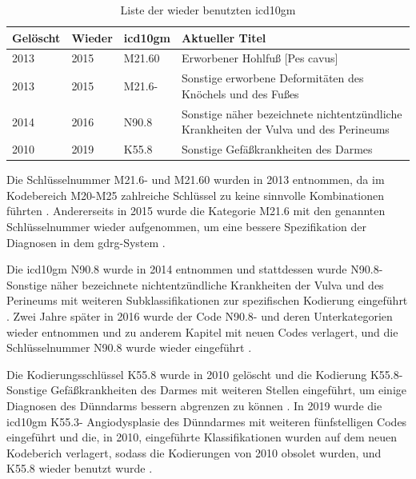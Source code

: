 \begin{table}[ht]
	\centering
	\small
	\caption[Wieder benutzte \acs{icd10gm}]{Liste der wieder benutzten \ac{icd10gm}}
	\label{tab:wieder}
	\begin{tabular}{|l|l|l|p{6cm}|}
		\hline
		\rowcolor{lightgray} Gelöscht & Wieder & \ac{icd10gm} & Aktueller Titel \\ \hline
		2013 & 2015 & M21.60 & Erworbener Hohlfuß [Pes cavus] \\ \hline
		2013 & 2015 & M21.6- & Sonstige erworbene Deformitäten des Knöchels und des Fußes \\ \hline
		2014 & 2016 & N90.8 & Sonstige näher bezeichnete nichtentzündliche Krankheiten der Vulva und des Perineums \\ \hline
		2010 & 2019 & K55.8 & Sonstige Gefäßkrankheiten des Darmes \\ \hline

\end{tabular}
\end{table}

Die Schlüsselnummer \textsf{M21.6-} und \textsf{M21.60} wurden in 2013 entnommen, da im Kodebereich \textsf{M20-M25} zahlreiche Schlüssel zu keine sinnvolle Kombinationen führten \cite{dele13}. Andererseits in 2015 wurde die Kategorie \textsf{M21.6} mit den genannten Schlüsselnummer wieder aufgenommen, um eine bessere Spezifikation der Diagnosen in dem \ac{gdrg}-System \cite{komm15}. 

Die \ac{icd10gm} \textsf{N90.8} wurde in 2014 entnommen und stattdessen wurde \textsf{N90.8-} \textsf{Sonstige näher bezeichnete nichtentzündliche Krankheiten der Vulva und des Perineums} mit weiteren Subklassifikationen zur spezifischen Kodierung eingeführt \cite{komm14}. Zwei Jahre später in 2016 wurde der Code \textsf{N90.8-} und deren Unterkategorien wieder entnommen und zu anderem Kapitel mit neuen Codes verlagert, und die Schlüsselnummer \textsf{N90.8} wurde wieder eingeführt \cite{komm16}.

Die Kodierungsschlüssel \textsf{K55.8} wurde in 2010 gelöscht und die Kodierung \textsf{K55.8-} \textsf{Sonstige Gefäßkrankheiten des Darmes} mit weiteren Stellen eingeführt, um einige Diagnosen des Dünndarms bessern abgrenzen zu können \cite{komm10}. In 2019 wurde die \ac{icd10gm} \textsf{K55.3-}   \textsf{Angiodysplasie des Dünndarmes} mit weiteren fünfstelligen Codes eingeführt und die, in 2010, eingeführte Klassifikationen wurden auf dem neuen Kodeberich verlagert, sodass die Kodierungen von 2010 obsolet wurden, und \textsf{K55.8} wieder benutzt wurde \cite{komm19}.

